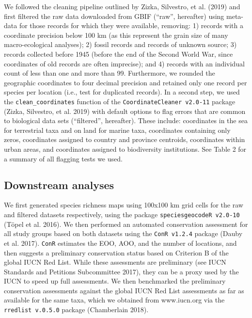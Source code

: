 \documentclass[fleqn,10pt,lineno]{wlpeerj} %
\begin{document}
We followed the cleaning pipeline outlined by Zizka, Silvestro, et al. (2019) and first filtered the raw data downloaded from GBIF (``raw'', hereafter) using meta-data for those records for which they were available, removing: 1) records with a coordinate precision below 100 km (as this represent the grain size of many macro-ecological analyses); 2) fossil records and records of unknown source; 3) records collected before 1945 (before the end of the Second World War, since coordinates of old records are often imprecise); and 4) records with an individual count of less than one and more than 99. Furthermore, we rounded the geographic coordinates to four decimal precision and retained only one record per species per location (i.e., test for duplicated records). In a second step, we used the \texttt{clean\_coordinates} function of the \texttt{CoordinateCleaner\ v2.0-11} package (Zizka, Silvestro, et al. 2019) with default options to flag errors that are common to biological data sets (``filtered'', hereafter). These include: coordinates in the sea for terrestrial taxa and on land for marine taxa, coordinates containing only zeros, coordinates assigned to country and province centroids, coordinates within urban areas, and coordinates assigned to biodiversity institutions. See Table 2 for a summary of all flagging tests we used.

\hypertarget{downstream-analyses}{%
\subsection*{Downstream analyses}\label{downstream-analyses}}

We first generated species richness maps using 100x100 km grid cells for the raw and filtered datasets respectively, using the package \texttt{speciesgeocodeR\ v2.0-10} (Töpel et al. 2016). We then performed an automated conservation assessment for all study groups based on both datasets using the \texttt{ConR\ v1.2.4} package (Dauby et al. 2017). \texttt{ConR} estimates the EOO, AOO, and the number of locations, and then suggests a preliminary conservation status based on Criterion B of the global IUCN Red List. While these assessments are preliminary (see IUCN Standards and Petitions Subcommittee 2017), they can be a proxy used by the IUCN to speed up full assessments. We then benchmarked the preliminary conservation assessments against the global IUCN Red List assessments as far as available for the same taxa, which we obtained from www.iucn.org via the \texttt{rredlist\ v.0.5.0} package (Chamberlain 2018).
\end{document}
